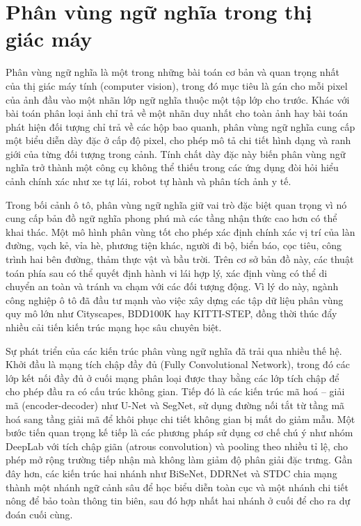 \section{Phân vùng ngữ nghĩa trong thị giác máy}

Phân vùng ngữ nghĩa là một trong những bài toán cơ bản và quan trọng nhất của thị giác máy tính (computer vision), trong đó mục tiêu là gán cho mỗi pixel của ảnh đầu vào một nhãn lớp ngữ nghĩa thuộc một tập lớp cho trước. Khác với bài toán phân loại ảnh chỉ trả về một nhãn duy nhất cho toàn ảnh hay bài toán phát hiện đối tượng chỉ trả về các hộp bao quanh, phân vùng ngữ nghĩa cung cấp một biểu diễn dày đặc ở cấp độ pixel, cho phép mô tả chi tiết hình dạng và ranh giới của từng đối tượng trong cảnh. Tính chất dày đặc này biến phân vùng ngữ nghĩa trở thành một công cụ không thể thiếu trong các ứng dụng đòi hỏi hiểu cảnh chính xác như xe tự lái, robot tự hành và phân tích ảnh y tế.

Trong bối cảnh ô tô, phân vùng ngữ nghĩa giữ vai trò đặc biệt quan trọng vì nó cung cấp bản đồ ngữ nghĩa phong phú mà các tầng nhận thức cao hơn có thể khai thác. Một mô hình phân vùng tốt cho phép xác định chính xác vị trí của làn đường, vạch kẻ, vỉa hè, phương tiện khác, người đi bộ, biển báo, cọc tiêu, công trình hai bên đường, thảm thực vật và bầu trời. Trên cơ sở bản đồ này, các thuật toán phía sau có thể quyết định hành vi lái hợp lý, xác định vùng có thể di chuyển an toàn và tránh va chạm với các đối tượng động. Vì lý do này, ngành công nghiệp ô tô đã đầu tư mạnh vào việc xây dựng các tập dữ liệu phân vùng quy mô lớn như Cityscapes, BDD100K hay KITTI-STEP, đồng thời thúc đẩy nhiều cải tiến kiến trúc mạng học sâu chuyên biệt.

Sự phát triển của các kiến trúc phân vùng ngữ nghĩa đã trải qua nhiều thế hệ. Khởi đầu là mạng tích chập đầy đủ (Fully Convolutional Network), trong đó các lớp kết nối đầy đủ ở cuối mạng phân loại được thay bằng các lớp tích chập để cho phép đầu ra có cấu trúc không gian. Tiếp đó là các kiến trúc mã hoá -- giải mã (encoder-decoder) như U-Net và SegNet, sử dụng đường nối tắt từ tầng mã hoá sang tầng giải mã để khôi phục chi tiết không gian bị mất do giảm mẫu. Một bước tiến quan trọng kế tiếp là các phương pháp sử dụng cơ chế chú ý như nhóm DeepLab với tích chập giãn (atrous convolution) và pooling theo nhiều tỉ lệ, cho phép mở rộng trường tiếp nhận mà không làm giảm độ phân giải đặc trưng. Gần đây hơn, các kiến trúc hai nhánh như BiSeNet, DDRNet và STDC chia mạng thành một nhánh ngữ cảnh sâu để học biểu diễn toàn cục và một nhánh chi tiết nông để bảo toàn thông tin biên, sau đó hợp nhất hai nhánh ở cuối để cho ra dự đoán cuối cùng.

